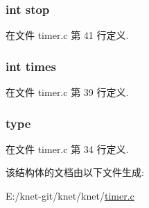 \hypertarget{struct__ktimer__t_a6c0af9f2e97842405fb15ed952ef2976}{}
\subsubsection[{stop}]{\setlength{\rightskip}{0pt plus 5cm}int stop}\label{struct__ktimer__t_a6c0af9f2e97842405fb15ed952ef2976}


在文件 timer.\+c 第 41 行定义.

\hypertarget{struct__ktimer__t_aad4f4c24ba75d1526ad9a49089a2d067}{}
\subsubsection[{times}]{\setlength{\rightskip}{0pt plus 5cm}int times}\label{struct__ktimer__t_aad4f4c24ba75d1526ad9a49089a2d067}


在文件 timer.\+c 第 39 行定义.

\hypertarget{struct__ktimer__t_aa889e3eed3259dbe68bac4c2887fd912}{}
\subsubsection[{type}]{ type}\label{struct__ktimer__t_aa889e3eed3259dbe68bac4c2887fd912}


在文件 timer.\+c 第 34 行定义.



该结构体的文档由以下文件生成\+:\begin{DoxyCompactItemize}
\item 
E\+:/knet-\/git/knet/knet/\hyperlink{knet_2timer_8c}{timer.\+c}\end{DoxyCompactItemize}

